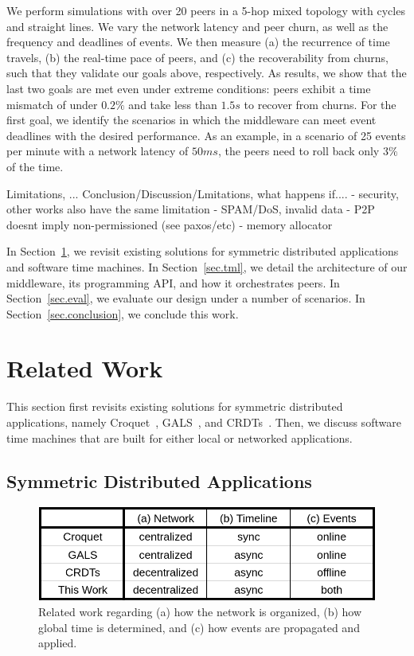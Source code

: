 \documentclass[fleqn,10pt]{SelfArx}
\begin{document}
We perform simulations with over 20 peers in a 5-hop mixed topology with cycles
and straight lines.
We vary the network latency and peer churn, as well as the frequency and
deadlines of events.
%
We then measure (a) the recurrence of time travels, (b) the real-time pace of
peers, and (c) the recoverability from churns, such that they validate our
goals above, respectively.
%
As results, we show that the last two goals are met even under extreme
conditions: peers exhibit a time mismatch of under $0.2\%$ and take less than
$1.5s$ to recover from churns.
%
For the first goal, we identify the scenarios in which the middleware can meet
event deadlines with the desired performance.
As an example, in a scenario of 25 events per minute with a network latency of
$50ms$, the peers need to roll back only $3\%$ of the time.

Limitations, ...
Conclusion/Discussion/Lmitations, what happens if....
- security, other works also have the same limitation
    - SPAM/DoS, invalid data
    - P2P doesnt imply non-permissioned (see paxos/etc)
- memory allocator

In Section~\ref{sec.related}, we revisit existing solutions for symmetric
distributed applications and software time machines.
In Section~\ref{sec.tml}, we detail the architecture of our middleware, its
programming API, and how it orchestrates peers.
In Section~\ref{sec.eval}, we evaluate our design under a number of scenarios.
In Section~\ref{sec.conclusion}, we conclude this work.

\section{Related Work}
\label{sec.related}

This section first revisits existing solutions for symmetric distributed
applications, namely Croquet~\cite{croquet}, GALS~\cite{gals}, and
CRDTs~\cite{crdts}.
Then, we discuss software time machines that are built for either local or
networked applications.

\subsection{Symmetric Distributed Applications}
\label{sec.related.sym}

\begin{figure}
  \centering
  \includegraphics[width=\linewidth]{table}
  \caption{
    Related work regarding
        (a) how the network is organized,
        (b) how global time is determined, and
        (c) how events are propagated and applied.
    \label{fig.table}
  }
\end{figure}
\end{document}
